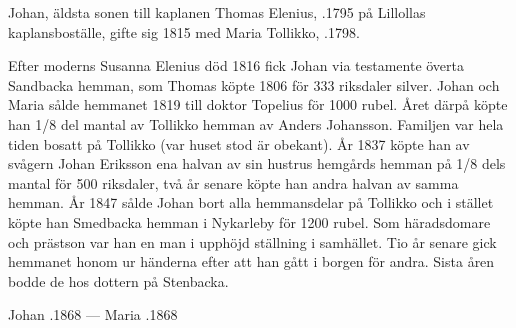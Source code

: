 %
Johan, äldsta sonen till kaplanen Thomas Elenius, .1795 på Lillollas kaplansboställe, gifte sig 1815 med Maria Tollikko, .1798.
\begin{jhchildren}
  \item {}
  \item {}
  \item {}
  \item {}
  \item {}
  \item {}
  \item {}
  \item {}
\end{jhchildren}
Efter moderns Susanna Elenius död 1816 fick Johan via testamente överta Sandbacka hemman, som Thomas köpte 1806 för 333 riksdaler silver. Johan och Maria sålde hemmanet 1819 till doktor Topelius för 1000 rubel. Året därpå köpte han 1/8 del mantal av Tollikko hemman av Anders Johansson. Familjen var hela tiden bosatt på Tollikko (var huset stod är obekant). År 1837 köpte han av svågern Johan Eriksson ena halvan av sin hustrus hemgårds hemman på 1/8 dels mantal för 500 	riksdaler, två år senare köpte han andra halvan av samma hemman. År 1847 sålde Johan bort alla hemmansdelar på Tollikko och i stället köpte han Smedbacka hemman i Nykarleby för 1200 rubel. Som häradsdomare och prästson var han en man i upphöjd ställning i samhället. Tio år senare gick hemmanet honom ur händerna efter att han gått i borgen för andra. Sista åren bodde de hos dottern på Stenbacka.

Johan .1868 --- Maria .1868



